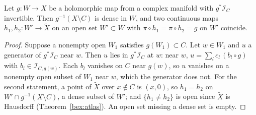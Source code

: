 \begin{lemma}
\label{bex:lift-unique}
\leanok
Let \(g\colon W\to X\) be a holomorphic map from a complex manifold with \(g^*\mathcal I_C\) invertible. Then \(g^{-1}(X\setminus C)\) is dense
in \(W\), and two continuous maps \(h_1,h_2\colon W'\to\tilde X\) on an open set \(W'\subset W\) with \(\pi\circ h_1=\pi\circ h_2=g\) on \(W'\)
coincide.
\end{lemma}
\begin{proof}
\leanok
Suppose a nonempty open \(W_1\) satisfies \(g(W_1)\subset C\). Let \(w\in W_1\) and \(u\) a generator of \(g^*\mathcal I_C\) near \(w\). Then \(u\) lies
in \(g^*\mathcal I_C\) at \(w\): near \(w\), \(u=\sum_lc_l\,(b_l\circ g)\) with \(b_l\in\mathcal I_{C,g(w)}\). Each \(b_l\) vanishes on \(C\) near
\(g(w)\), so \(u\) vanishes on a nonempty open subset of \(W_1\) near \(w\), which the generator does not. For the second statement, a point of
\(\tilde X\) over \(x\notin C\) is \((x,0)\), so \(h_1=h_2\) on \(W'\cap g^{-1}(X\setminus C)\), a dense subset of \(W'\); and
\(\{h_1\ne h_2\}\) is open since \(\tilde X\) is Hausdorff (Theorem~\ref{bex:atlas}). An open set missing a dense set is empty.
\end{proof}